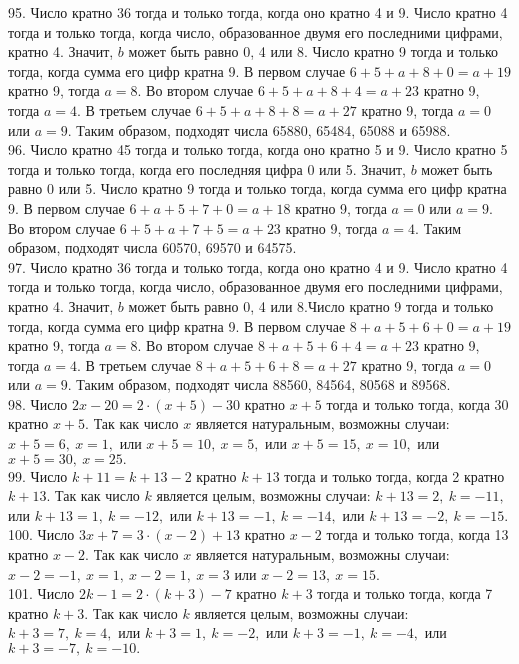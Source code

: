 95. Число кратно 36 тогда и только тогда, когда оно кратно 4 и 9. Число кратно 4 тогда и только тогда, когда число, образованное двумя его последними цифрами, кратно 4. Значит, $b$ может быть равно 0, 4 или 8. Число кратно 9 тогда и только тогда, когда сумма его цифр кратна 9. В первом случае $6+5+a+8+0=a+19$ кратно 9, тогда $a=8.$ Во втором случае $6+5+a+8+4=a+23$ кратно 9, тогда $a=4.$ В третьем случае $6+5+a+8+8=a+27$ кратно 9, тогда $a=0$ или $a=9.$ Таким образом, подходят числа 65880, 65484, 65088 и 65988.\\
96. Число кратно 45 тогда и только тогда, когда оно кратно 5 и 9. Число кратно 5 тогда и только тогда, когда его последняя цифра 0 или 5. Значит, $b$ может быть равно 0 или 5. Число кратно 9 тогда и только тогда, когда сумма его цифр кратна 9. В первом случае $6+a+5+7+0=a+18$ кратно 9, тогда $a=0$ или $a=9.$ Во втором случае $6+5+a+7+5=a+23$ кратно 9, тогда $a=4.$ Таким образом, подходят числа 60570, 69570 и 64575.\\
97. Число кратно 36 тогда и только тогда, когда оно кратно 4 и 9. Число кратно 4 тогда и только тогда, когда число, образованное двумя его последними цифрами, кратно 4. Значит, $b$ может быть равно 0, 4 или 8.Число кратно 9 тогда и только тогда, когда сумма его цифр кратна 9. В первом случае $8+a+5+6+0=a+19$ кратно 9, тогда $a=8.$ Во втором случае $8+a+5+6+4=a+23$ кратно 9, тогда $a=4.$ В третьем случае $8+a+5+6+8=a+27$ кратно 9, тогда $a=0$ или $a=9.$ Таким образом, подходят числа 88560, 84564, 80568 и 89568.\\
98. Число $2x-20=2\cdot(x+5)-30$ кратно $x+5$ тогда и только тогда, когда 30 кратно $x+5.$ Так как число $x$ является натуральным, возможны случаи: $x+5=6,\ x=1,$ или $x+5=10,\ x=5,$ или $x+5=15,\ x=10,$ или $x+5=30,\ x=25.$\\
99. Число $k+11=k+13-2$ кратно $k+13$ тогда и только тогда, когда 2 кратно $k+13.$ Так как число $k$ является целым, возможны случаи: $k+13=2,\ k=-11,$ или $k+13=1,\ k=-12,$ или $k+13=-1,\ k=-14,$ или $k+13=-2,\ k=-15.$\\
100. Число $3x+7=3\cdot(x-2)+13$ кратно $x-2$ тогда и только тогда, когда 13 кратно $x-2.$ Так как число $x$ является натуральным, возможны случаи: $x-2=-1,\ x=1,\ x-2=1,\ x=3$ или $x-2=13,\ x=15.$\\
101. Число $2k-1=2\cdot(k+3)-7$ кратно $k+3$ тогда и только тогда, когда 7 кратно $k+3.$ Так как число $k$ является целым, возможны случаи: $k+3=7,\ k=4,$ или $k+3=1,\ k=-2,$ или $k+3=-1,\ k=-4,$ или $k+3=-7,\ k=-10.$\\
